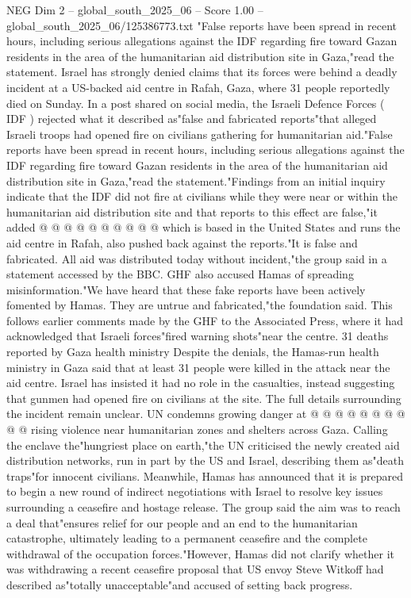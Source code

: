 \begin{textsample}{NEG Dim 2 – global\_south\_2025\_06 – Score 1.00 – global\_south\_2025\_06/125386773.txt}  \label{ex:f2_neg_202}
"False reports have been spread in recent hours, including serious allegations against the IDF regarding fire toward Gazan residents in the area of the humanitarian aid distribution site in Gaza,"read the statement.
Israel has strongly denied claims that its forces were behind a deadly incident at a US-backed aid centre in Rafah, Gaza, where 31 people reportedly died on Sunday.
In a post shared on social media, the Israeli Defence Forces ( IDF ) rejected what it described as"false and fabricated reports"that alleged Israeli troops had opened fire on civilians gathering for humanitarian aid."False reports have been spread in recent hours, including serious allegations against the IDF regarding fire toward Gazan residents in the area of the humanitarian aid distribution site in Gaza,"read the statement."Findings from an initial inquiry indicate that the IDF did not fire at civilians while they were near or within the humanitarian aid distribution site and that reports to this effect are false,"it added @ @ @ @ @ @ @ @ @ @ which is based in the United States and runs the aid centre in Rafah, also pushed back against the reports."It is false and fabricated.
All aid was distributed today without incident,"the group said in a statement accessed by the BBC.
GHF also accused Hamas of spreading misinformation."We have heard that these fake reports have been actively fomented by Hamas.
They are untrue and fabricated,"the foundation said.
This follows earlier comments made by the GHF to the Associated Press, where it had acknowledged that Israeli forces"fired warning shots"near the centre. 31 deaths reported by Gaza health ministry Despite the denials, the Hamas-run health ministry in Gaza said that at least 31 people were killed in the attack near the aid centre.
Israel has insisted it had no role in the casualties, instead suggesting that gunmen had opened fire on civilians at the site.
The full details surrounding the incident remain unclear.
UN condemns growing danger at @ @ @ @ @ @ @ @ @ @ rising violence near humanitarian zones and shelters across Gaza.
Calling the enclave the"hungriest place on earth,"the UN criticised the newly created aid distribution networks, run in part by the US and Israel, describing them as"death traps"for innocent civilians.
Meanwhile, Hamas has announced that it is prepared to begin a new round of indirect negotiations with Israel to resolve key issues surrounding a ceasefire and hostage release.
The group said the aim was to reach a deal that"ensures relief for our people and an end to the humanitarian catastrophe, ultimately leading to a permanent ceasefire and the complete withdrawal of the occupation forces."However, Hamas did not clarify whether it was withdrawing a recent ceasefire proposal that US envoy Steve Witkoff had described as"totally unacceptable"and accused of setting back progress.

\end{textsample}
